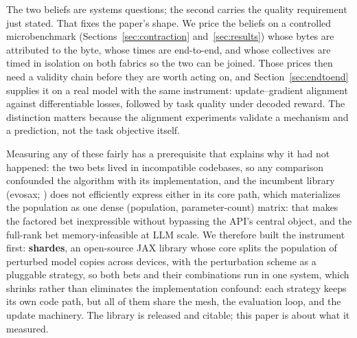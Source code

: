 The two beliefs are systems questions; the second carries the quality
requirement just stated. That fixes the paper's shape. We price the beliefs on a
controlled microbenchmark (Sections~\ref{sec:contraction}
and~\ref{sec:results}) whose bytes are attributed to the byte, whose times
are end-to-end, and whose collectives are timed in isolation on both fabrics
so the two can be joined. Those prices
then need a validity chain before they are worth acting on, and
Section~\ref{sec:endtoend} supplies it on a real model with the same
instrument: update--gradient alignment against differentiable losses, followed
by task quality under decoded reward. The distinction matters because the
alignment experiments validate a mechanism and a prediction, not the task
objective itself.

Measuring any of these fairly has a prerequisite that explains why it had not
happened: the two bets lived in incompatible codebases, so any comparison
confounded the algorithm with its implementation, and the incumbent library
(evosax; \citealp{lange2022evosax}) does not efficiently express either in its core path, which
materializes the population as one dense (population, parameter-count)
matrix: that makes the factored bet inexpressible without bypassing the
API's central object, and the full-rank bet memory-infeasible at LLM
scale. We therefore built the
instrument first: \textbf{shardes}, an open-source JAX \citep{jax2018} library whose core
splits the population of perturbed model copies across devices, with the
perturbation scheme as a pluggable strategy, so both bets and their
combinations run in one system, which shrinks rather than eliminates the
implementation confound: each strategy keeps its own code path, but all of
them share the mesh, the evaluation loop, and the update machinery. The library is released and citable;
this paper is about what it measured.

